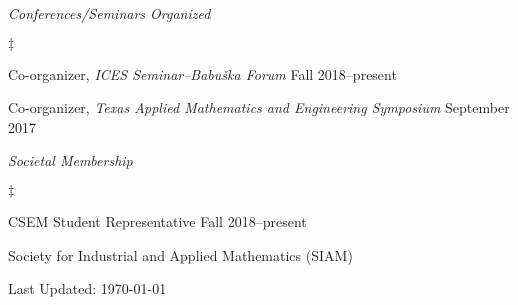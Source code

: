 \documentclass[margin,line]{res}
\newenvironment{list2}{
  \begin{list}{$\ddagger$}{%
      \setlength{\itemsep}{0in}
      \setlength{\parsep}{0in} \setlength{\parskip}{0in}
      \setlength{\topsep}{0in} \setlength{\partopsep}{0in}
      \setlength{\leftmargin}{0.2in}}}{\end{list}}
\begin{document}
\begin{resume}
\textit{Conferences/Seminars Organized}
\vspace{0.05in}
\begin{list2}
\item Co-organizer, {\em ICES Seminar--Babu\v{s}ka Forum} \hfill Fall 2018--present
\item Co-organizer, {\em Texas Applied Mathematics and Engineering Symposium} \hfill September 2017
\end{list2}

\textit{Societal Membership}
\vspace{0.05in}
\begin{list2}
\item CSEM Student Representative \hfill Fall 2018--present
\item Society for Industrial and Applied Mathematics (SIAM)
\end{list2}
\end{resume}
\vfill
\centerline{Last Updated: \today}
\end{document}
